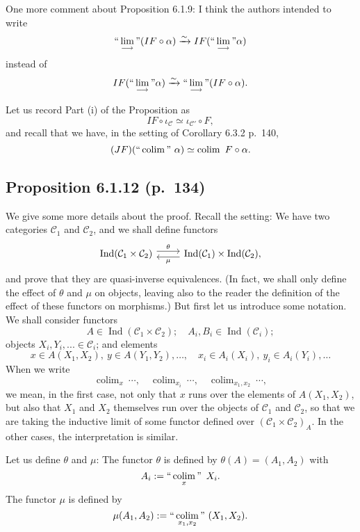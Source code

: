 \documentclass[12pt]{article}
\theoremstyle{remark}
\theoremstyle{definition}
\newcommand{\C}{\mathcal C}
\newcommand{\colim}{\operatornamewithlimits{\underset{\longrightarrow}{lim}}}
\DeclareMathOperator*{\coli}{colim}
\DeclareMathOperator*{\co}{colim}
\DeclareMathOperator*{\ic}{``\coli"}
\DeclareMathOperator{\Ind}{Ind}
\begin{document}
One more comment about Proposition 6.1.9: I think the authors intended to write 
%
\begin{equation}\label{133ii}
``\colim"(IF\circ\alpha)\xrightarrow\sim IF(``\colim"\alpha)
\end{equation} 
%
instead of 
$$
IF(``\colim"\alpha)\xrightarrow\sim``\colim"(IF\circ\alpha). 
$$ 

Let us record Part (i) of the Proposition as 
%
\begin{equation}\label{133i}
IF\circ\iota_\C\simeq\iota_{\C'}\circ F, 
\end{equation} 
%
and recall that we have, in the setting of Corollary 6.3.2 p.~140, 
%
\begin{equation}\label{140}
(JF)(``\coli"\ \alpha)\simeq\coli\ F\circ\alpha.
\end{equation}
%
%
\subsection{Proposition 6.1.12 (p.~134)}\label{6112}
%
We give some more details about the proof. Recall the setting: We have two categories $\C_1$ and $\C_2$, and we shall define functors
$$
\begin{tikzcd}
\Ind(\C_1\times\C_2)\ar[yshift=0.7ex]{r}{\theta}&\Ind(\C_1)\times\Ind(\C_2),\ar[yshift=-0.7ex]{l}{\mu}
\end{tikzcd}
$$ 
and prove that they are quasi-inverse equivalences. (In fact, we shall only define the effect of $\theta$ and $\mu$ on objects, leaving also to the reader the definition of the effect of these functors on morphisms.) But first let us introduce some notation. We shall consider functors 
$$
A\in\Ind(\C_1\times\C_2);\quad A_i,B_i\in\Ind(\C_i);
$$ 
objects $X_i,Y_i,...\in\C_i$; and elements 
$$
x\in A(X_1,X_2),\ y\in A(Y_1,Y_2),\dots,\quad x_i\in A_i(X_i),\ y_i\in A_i(Y_i),\dots
$$ 
When we write 
$$
\co_x\ \cdots,\quad\co_{x_i}\ \cdots,\quad\co_{x_1,x_2}\ \cdots,
$$ 
we mean, in the first case, not only that $x$ runs over the elements of $A(X_1,X_2)$, but also that $X_1$ and $X_2$ themselves run over the objects of $\C_1$ and $\C_2$, so that we are taking the inductive limit of some functor defined over $(\C_1\times\C_2)_A$. In the other cases, the interpretation is similar. 

Let us define $\theta$ and $\mu$: The functor $\theta$ is defined by $\theta(A)=(A_1,A_2)$ with
%
\begin{equation}\label{ai}
A_i:=\ic_x\ X_i. 
\end{equation}
%
The functor $\mu$ is defined by 
$$
\mu(A_1,A_2):=\ic_{x_1,x_2}\ (X_1,X_2). 
$$ 
\end{document}
